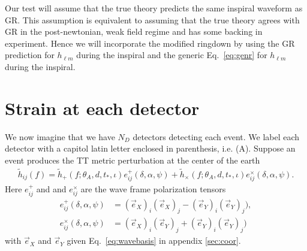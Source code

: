 \documentclass[aps,prd,amsmath,showpacs,amssymb,superscriptaddress,nofootinbib,longbibliography,eqsecnum,preprintnumbers]{revtex4-1}
\newcommand{\Ys}{{}_{-2}Y_{\ell m}}
\newcommand{\zach}[1]{\textcolor{ForestGreen}{#1}}
\begin{document}
Our test will assume that the true theory predicts the same inspiral waveform as GR. This assumption is equivalent to assuming that the true theory agrees with GR in the post-newtonian, weak field regime and has some backing in experiment. Hence we will incorporate the modified ringdown by using the GR prediction for $h_{\ell m}$ during the inspiral and the generic Eq.~\eqref{eq:genr} for $h_{\ell m}$ during the inspiral.

\section{Strain at each detector}

We now imagine that we have $N_D$ detectors detecting each event. We label each detector with a capitol latin letter enclosed in parenthesis, i.e. (A). Suppose an event produces the TT metric perturbation at the center of the earth
\begin{align}
\tilde h_{ij}(f)=\tilde h_+(f;\theta_A,d,t_*,\iota)e_{ij}^+(\delta,\alpha,\psi) +\tilde h_\times(f;\theta_A,d,t_*,\iota)e_{ij}^\times(\delta,\alpha,\psi).
\end{align}
Here $e^+_{ij}$ and and $e^\times_{ij}$ are the wave frame polarization tensors
\begin{align}
e^+_{ij}(\delta,\alpha,\psi)&=(\vec e_X)_i(\vec e_X)_j-(\vec e_Y)_i(\vec e_Y)_j), \nonumber \\
e^\times_{ij}(\delta,\alpha,\psi)&=(\vec e_X)_i(\vec e_Y)_j+(\vec e_Y)_i(\vec e_Y)_j)
\end{align}
with $\vec e_X$ and $\vec e_Y$ given Eq.~\eqref{eq:wavebasis} in appendix \ref{sec:coor}.
\end{document}
